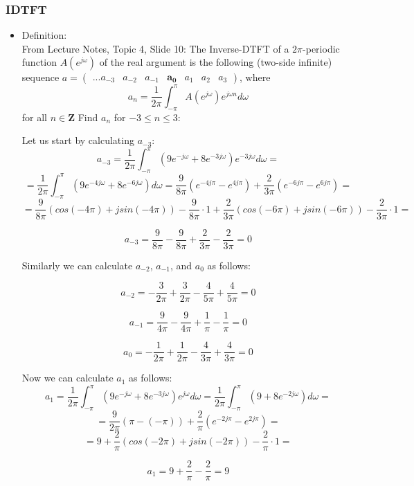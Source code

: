 \documentclass[12pt,a4paper]{article}
\begin{document}
\subsubsection{IDTFT}  
\begin{itemize}
    \item Definition:\\
    From Lecture Notes, Topic 4, Slide 10: The Inverse-DTFT of a $2\pi$-periodic function $A(e^{j\omega})$ of the real argument is the following (two-side infinite) sequence $a = \begin{pmatrix} ...a_{-3} & a_{-2} & a_{-1} & \boldsymbol{a_0} & a_1 & a_2 & a_3 \end{pmatrix}$, where 
    $$ a_n = \frac{1}{2\pi} \int_{-\pi}^{\pi} A(e^{j\omega})e^{j\omega n}d\omega $$
    for all $n \in \boldsymbol Z$
    Find $a_n$ for $-3\leq n \leq 3$:
  
    Let us start by calculating $a_{-3}$:
        $$ a_{-3} =  \frac{1}{2\pi} \int_{-\pi}^{\pi} (9e^{-j\omega} + 8e^{-3j\omega})e^{-3j\omega}d\omega =$$
        $$ = \frac{1}{2\pi} \int_{-\pi}^{\pi} (9e^{-4j\omega} + 8e^{-6j\omega})d\omega = \frac{9}{8\pi}(e^{-4j\pi} - e^{4j\pi}) + \frac{2}{3\pi}(e^{-6j\pi} - e^{6j\pi}) =  $$
        $$ = \frac{9}{8\pi}(cos(-4\pi) + jsin(-4\pi)) - \frac{9}{8\pi}\cdot 1 + \frac{2}{3\pi}(cos(-6\pi) + jsin(-6\pi)) - \frac{2}{3\pi}\cdot 1 = $$
        
        $$ a_{-3} = \frac{9}{8\pi} - \frac{9}{8\pi} + \frac{2}{3\pi} - \frac{2}{3\pi} = 0 $$

         Similarly we can calculate $a_{-2}$, $a_{-1}$, and $a_0$ as follows:
         
        $$ a_{-2} = - \frac{3}{2\pi} + \frac{3}{2\pi} - \frac{4}{5\pi} + \frac{4}{5\pi} = 0 $$
    
        $$ a_{-1} = \frac{9}{4\pi} - \frac{9}{4\pi} + \frac{1}{\pi} - \frac{1}{\pi} = 0$$
        
        $$a_0 = - \frac{1}{2\pi} + \frac{1}{2\pi} - \frac{4}{3\pi} + \frac{4}{3\pi} = 0$$
    
        
        Now we can calculate $a_1$ as follows:
        $$ a_1 =  \frac{1}{2\pi} \int_{-\pi}^{\pi} (9e^{-j\omega} + 8e^{-3j\omega})e^{j\omega}d\omega = \frac{1}{2\pi} \int_{-\pi}^{\pi} (9 + 8e^{-2j\omega})d\omega =$$
        $$ = \frac{9}{2\pi}(\pi - (-\pi)) + \frac{2}{\pi}(e^{-2j\pi} - e^{2j\pi}) =  $$
        $$ = 9 + \frac{2}{\pi}(cos(-2\pi) + jsin(-2\pi)) - \frac{2}{\pi}\cdot 1 = $$
        
         $$a_1 = 9 + \frac{2}{\pi} - \frac{2}{\pi} = 9$$
         

\end{itemize}
\end{document}
